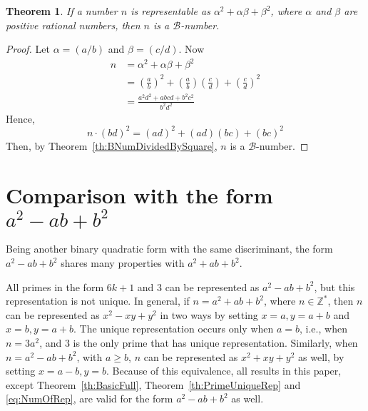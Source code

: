 \documentclass[reqno]{amsart}
\newtheorem{theorem}{Theorem}
\newcommand{\bnum}   {\ensuremath{\mathcal B}-number}
\newcommand{\bq}[2]{\ensuremath{{#1}^2 + {#1}{#2} + {#2}^2}}
\newcommand{\bqm}[2]{\ensuremath{{#1}^2 - {#1}{#2} + {#2}^2}}
\newcommand{\bqab}{\bq{a}{b}}
\newcommand{\bqxy}{\bq{x}{y}}
\newcommand{\bqmab}{\bqm{a}{b}}
\newcommand{\bqmxy}{\bqm{x}{y}}
\newcommand{\Nonnegative}{\ensuremath{\mathbb{Z^*}}}
\begin{document}
\begin{theorem}
\label{th:RationalBNum}
If a number $n$ is representable as \bq{\alpha}{\beta},
where $\alpha$ and $\beta$ are positive rational numbers,
then $n$ is a \bnum. 
\end{theorem}
\begin{proof}
Let $\alpha = (a/b)$ and $\beta = (c/d)$.  Now
  \begin{equation*}
    \begin{split}
      n &= \bq{\alpha}{\beta} \\
      &= \bq{\left(\frac{a}{b}\right)}{\left(\frac{c}{d}\right)} \\
      &= \frac{a^2d^2 + abcd + b^2c^2}{b^2d^2}
    \end{split}  
  \end{equation*}
Hence,
\begin{equation*}
  n \cdot (bd)^2 = \bq{(ad)}{(bc)}
\end{equation*}
Then, by Theorem~\ref{th:BNumDividedBySquare}, $n$ is a \bnum.
\end{proof}


\section{Comparison with the form \bqmab}

Being another binary quadratic form with the same
discriminant, the form \bqmab{} shares many
properties with \bqab. 

All primes in the form $6k+1$ and $3$ can be represented as
\bqmab, but this representation is not unique.  In general,
if $n = \bqab$, where $n \in \Nonnegative$, then $n$ can be represented as
\bqmxy{} in two ways by setting $ x = a,  y = a + b$
and $x = b, y = a + b$.  The unique representation occurs only when $a=b$, i.e., when
$n=3a^2$, and $3$ is the only prime that has unique
representation.  Similarly, when $n=\bqmab$, with $a \ge b$, $n$ can be
represented as \bqxy{} as well, by setting $x = a-b, y =
b$. Because of this equivalence, all results in this paper,
except Theorem~\ref{th:BasicFull},
Theorem~\ref{th:PrimeUniqueRep} 
 and \eqref{eq:NumOfRep}, are
valid for the form \bqmab{} as well.
\end{document}
